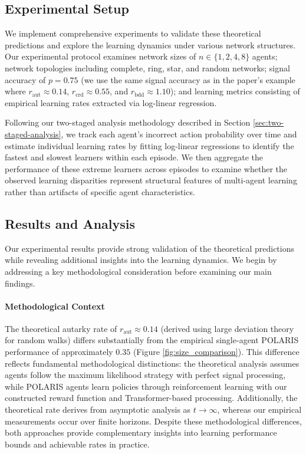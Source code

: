\subsection{Experimental Setup}

We implement comprehensive experiments to validate these theoretical predictions and explore the learning dynamics under various network structures. Our experimental protocol examines network sizes of $n \in \{1, 2, 4, 8\}$ agents; network topologies including complete, ring, star, and random networks; signal accuracy of $p = 0.75$ (we use the same signal accuracy as in the paper's example where $r_{\text{aut}} \approx 0.14$, $r_{\text{crd}} \approx 0.55$, and $r_{\text{bdd}} \approx 1.10$); and learning metrics consisting of empirical learning rates extracted via log-linear regression.

Following our two-staged analysis methodology described in Section \ref{sec:two-staged-analysis}, we track each agent's incorrect action probability over time and estimate individual learning rates by fitting log-linear regressions to identify the fastest and slowest learners within each episode. We then aggregate the performance of these extreme learners across episodes to examine whether the observed learning disparities represent structural features of multi-agent learning rather than artifacts of specific agent characteristics.

\subsection{Results and Analysis}

Our experimental results provide strong validation of the theoretical predictions while revealing additional insights into the learning dynamics. We begin by addressing a key methodological consideration before examining our main findings.

\paragraph{Methodological Context} The theoretical autarky rate of $r_{\text{aut}} \approx 0.14$ (derived using large deviation theory for random walks) differs substantially from the empirical single-agent POLARIS performance of approximately $0.35$ (Figure \ref{fig:size_comparison}). This difference reflects fundamental methodological distinctions: the theoretical analysis assumes agents follow the maximum likelihood strategy with perfect signal processing, while POLARIS agents learn policies through reinforcement learning with our constructed reward function and Transformer-based processing. Additionally, the theoretical rate derives from asymptotic analysis as $t \to \infty$, whereas our empirical measurements occur over finite horizons. Despite these methodological differences, both approaches provide complementary insights into learning performance bounds and achievable rates in practice.


